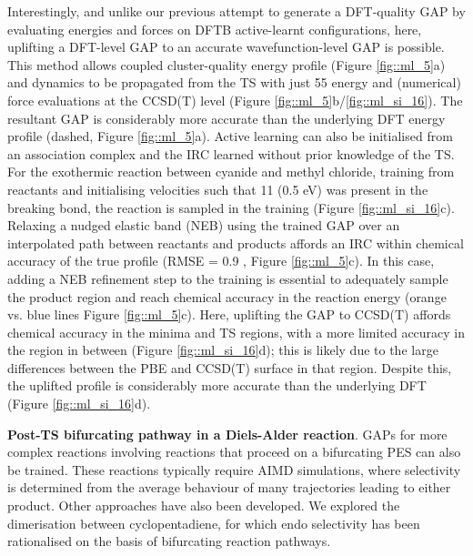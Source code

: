 \documentclass[../../main.tex]{subfiles}
\begin{document}
Interestingly, and unlike our previous attempt to generate a DFT-quality GAP by evaluating energies and forces on DFTB active-learnt configurations, here, uplifting a DFT-level GAP to an accurate wavefunction-level GAP is possible. This method allows coupled cluster-quality energy profile (Figure \ref{fig::ml_5}a) and dynamics to be propagated from the TS with just 55 energy and (numerical) force evaluations at the CCSD(T) level (Figure \ref{fig::ml_5}b/\ref{fig::ml_si_16}). The resultant GAP is considerably more accurate than the underlying DFT energy profile (dashed, Figure \ref{fig::ml_5}a). Active learning can also be initialised from an association complex and the IRC learned without prior knowledge of the TS. For the exothermic reaction between cyanide and methyl chloride, training from reactants and initialising velocities such that 11 \kcalx (0.5 eV) was present in the breaking bond, the reaction is sampled in the training (Figure \ref{fig::ml_si_16}c). Relaxing a nudged elastic band (NEB) using the trained GAP over an interpolated path between reactants and products affords an IRC within chemical accuracy of the true profile (RMSE = 0.9 \kcal, Figure \ref{fig::ml_5}c). In this case, adding a NEB refinement step to the training is essential to adequately sample the product region and reach chemical accuracy in the reaction energy (orange vs. blue lines Figure \ref{fig::ml_5}c). Here, uplifting the GAP to CCSD(T) affords chemical accuracy in the minima and TS regions, with a more limited accuracy in the region in between (Figure \ref{fig::ml_si_16}d); this is likely due to the large differences between the PBE and CCSD(T) surface in that region. Despite this, the uplifted profile is considerably more accurate than the underlying DFT (Figure \ref{fig::ml_si_16}d).


{\bfseries{Post-TS bifurcating pathway in a Diels-Alder reaction}}.  GAPs for more complex reactions involving reactions that proceed on a bifurcating PES can also be trained. These reactions typically require AIMD simulations, where selectivity is determined from the average behaviour of many trajectories leading to either product. Other approaches have also been developed.\cite{Lee2020} We explored the dimerisation between cyclopentadiene, for which endo selectivity has been rationalised on the basis of bifurcating reaction pathways.\cite{Caramella2002} 
\end{document}
